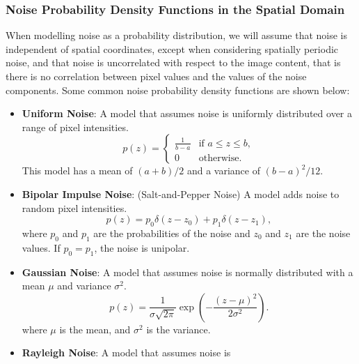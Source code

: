 \documentclass{article}
\begin{document}
\subsubsection{Noise Probability Density Functions in the Spatial Domain}
When modelling noise as a probability distribution, we will assume that
noise is independent of spatial coordinates, except when considering
spatially periodic noise, and that noise is uncorrelated with respect
to the image content, that is there is no correlation between pixel
values and the values of the noise components. Some common noise
probability density functions are shown below:
\begin{itemize}
    \item \textbf{Uniform Noise}: A model that assumes noise is
          uniformly distributed over a range of pixel intensities.
          \begin{equation*}
              p\left( z \right) =
              \begin{cases}
                  \displaystyle\frac{1}{b - a} & \text{if } a \leq z \leq b, \\
                  0                            & \text{otherwise}.
              \end{cases}
          \end{equation*}
          This model has a mean of \(\left( a + b \right)/2\) and a
          variance of \(\left( b - a \right)^2/12\).
    \item \textbf{Bipolar Impulse Noise}: (Salt-and-Pepper Noise) A
          model adds noise to random pixel intensities.
          \begin{equation*}
              p\left( z \right) = p_0 \delta\left( z - z_0 \right) + p_1 \delta\left( z - z_1 \right),
          \end{equation*}
          where \(p_0\) and \(p_1\) are the probabilities of the noise
          and \(z_0\) and \(z_1\) are the noise values. If \(p_0 = p_1\),
          the noise is unipolar.
    \item \textbf{Gaussian Noise}: A model that assumes noise is
          normally distributed with a mean \(\mu\) and variance
          \(\sigma^2\).
          \begin{equation}
              p\left( z \right) = \frac{1}{\sigma \sqrt{2\pi}} \exp\left( -\frac{\left( z - \mu \right)^2}{2\sigma^2} \right).
          \end{equation}
          where \(\mu\) is the mean, and \(\sigma^2\) is the variance.
    \item \textbf{Rayleigh Noise}: A model that assumes noise is

\end{itemize}
\end{document}
